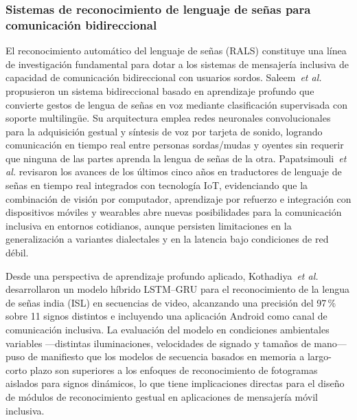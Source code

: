 \documentclass[journal]{IEEEtran}
\begin{document}
			\subsubsection{Sistemas de reconocimiento de lenguaje de se\~nas para comunicaci\'on bidireccional}
				El reconocimiento autom\'atico del lenguaje de se\~nas (RALS) constituye una l\'inea de investigaci\'on fundamental para dotar a los sistemas de mensajer\'ia inclusiva de capacidad de comunicaci\'on bidireccional con usuarios sordos. Saleem~\textit{et al.} \cite{saleem2023} propusieron un sistema bidireccional basado en aprendizaje profundo que convierte gestos de lengua de se\~nas en voz mediante clasificaci\'on supervisada con soporte multiling\"ue. Su arquitectura emplea redes neuronales convolucionales para la adquisici\'on gestual y s\'intesis de voz por tarjeta de sonido, logrando comunicaci\'on en tiempo real entre personas sordas/mudas y oyentes sin requerir que ninguna de las partes aprenda la lengua de se\~nas de la otra. Papatsimouli~\textit{et al.} \cite{papatsimouli2023} revisaron los avances de los \'ultimos cinco a\~nos en traductores de lenguaje de se\~nas en tiempo real integrados con tecnolog\'ia IoT, evidenciando que la combinaci\'on de visi\'on por computador, aprendizaje por refuerzo e integraci\'on con dispositivos m\'oviles y wearables abre nuevas posibilidades para la comunicaci\'on inclusiva en entornos cotidianos, aunque persisten limitaciones en la generalizaci\'on a variantes dialectales y en la latencia bajo condiciones de red d\'ebil.
				
				Desde una perspectiva de aprendizaje profundo aplicado, Kothadiya~\textit{et al.} \cite{kothadiya2022} desarrollaron un modelo h\'ibrido LSTM--GRU para el reconocimiento de la lengua de se\~nas india (ISL) en secuencias de video, alcanzando una precisi\'on del 97\,\% sobre 11 signos distintos e incluyendo una aplicaci\'on Android como canal de comunicaci\'on inclusiva. La evaluaci\'on del modelo en condiciones ambientales variables ---distintas iluminaciones, velocidades de signado y tama\~nos de mano--- puso de manifiesto que los modelos de secuencia basados en memoria a largo-corto plazo son superiores a los enfoques de reconocimiento de fotogramas aislados para signos din\'amicos, lo que tiene implicaciones directas para el dise\~no de m\'odulos de reconocimiento gestual en aplicaciones de mensajer\'ia m\'ovil inclusiva.
		
\end{document}
